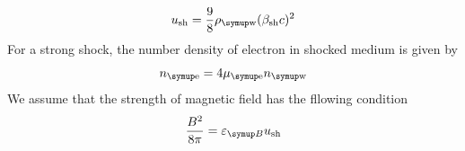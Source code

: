 \documentclass{notebook}
\begin{document}
\begin{equation}
  u_{\shock}
  =
  \frac{9}{8}\rho_{\wind}(\betash c)^2
\end{equation}
For a strong shock,
the number density of electron in shocked medium
is given by
\begin{equation}
  n_{\ele} 
  = 4\mu_{\ele} n_{\wind}
\end{equation}
We assume that
the strength of magnetic field has the fllowing condition
\begin{equation}
  \frac{B^2}{8\pi} = \epsB u_{\shock}
\end{equation}
\end{document}
